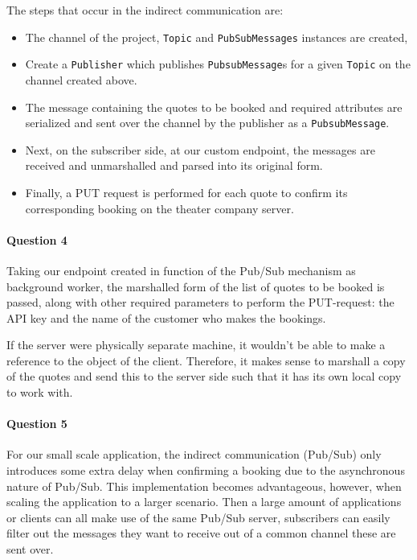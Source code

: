\documentclass{ds-report}
\begin{document}
	The steps that occur in the indirect communication are:
	 \begin{itemize}
	 	\item The channel of the project, \texttt{Topic} and \texttt{PubSubMessages} instances are created,
	 	\item Create a \texttt{Publisher} which publishes \texttt{PubsubMessage}s for a given \texttt{Topic} on the channel created above.
	 	\item The message containing the quotes to be booked and required attributes are serialized and sent over the channel by the publisher as a \texttt{PubsubMessage}.
	 	\item Next, on the subscriber side, at our custom endpoint, the messages are received and unmarshalled and parsed into its original form.
	 	\item Finally, a PUT request is performed for each quote to confirm its corresponding booking on the theater company server.
	 \end{itemize}
 
 	\paragraph{Question 4}
 	Taking our endpoint created in function of the Pub/Sub mechanism as background worker, the marshalled form of the list of quotes to be booked is passed, along with other required parameters to perform the PUT-request: the API key and the name of the customer who makes the bookings. 
 	
 	If the server were physically separate machine, it wouldn't be able to make a reference to the object of the client. Therefore, it makes sense to marshall a copy of the quotes and send this to the server side such that it has its own local copy to work with.
	
	\paragraph{Question 5}
	For our small scale application, the indirect communication (Pub/Sub) only introduces some extra delay when confirming a booking due to the asynchronous nature of Pub/Sub. This implementation becomes advantageous, however, when scaling the application to a larger scenario. Then a large amount of applications or clients can all make use of the same Pub/Sub server, subscribers can easily filter out the messages they want to receive out of a common channel these are sent over.
	
\end{document}
